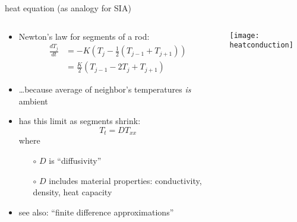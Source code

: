 \begin{frame}{heat equation (as analogy for SIA) }

\begin{columns}
\begin{column}{0.7\textwidth}
\begin{itemize}
\item Newton's law for segments of a rod:
\begin{align*}
\frac{dT_j}{dt} &= -K \left(T_j - \frac{1}{2} (T_{j-1} + T_{j+1}) \right) \\
	&= \frac{K}{2} \left(T_{j-1} - 2 T_j + T_{j+1}\right) 
\end{align*}
\item \dots because average of neighbor's temperatures \emph{is} ambient 
\item has this limit as segments shrink:
	$$T_t = D T_{xx}$$
where
  \begin{itemize}
  \item[$\circ$] $D$ is ``diffusivity''
  \item[$\circ$] $D$ includes material properties: conductivity, density, heat capacity
  \end{itemize}

\medskip
\small
\item see also: ``finite difference approximations''
\end{itemize}
\end{column}

\begin{column}{0.3\textwidth}
\vspace{5mm}

\hspace{-10mm}\texttt{[image: heatconduction]}
\end{column}
\end{columns}
\end{frame}


